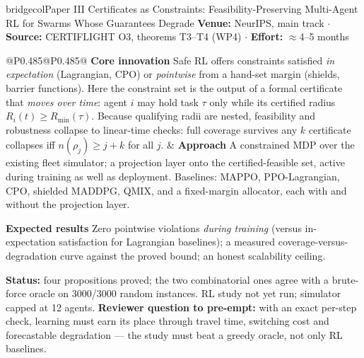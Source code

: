 \documentclass[10pt,a4paper]{article}
\newcommand{\hd}[1]{\textcolor{netcol}{\textbf{#1}}\enspace}
\begin{document}
\begin{card}{bridgecol}{Paper III}
  {Certificates as Constraints: Feasibility-Preserving Multi-Agent RL for
   Swarms Whose Guarantees Degrade}
  {}
\textbf{Venue:} NeurIPS, main track \enspace$\cdot$\enspace
\textbf{Source:} CERTIFLIGHT O3, theorems T3--T4 (WP4) \enspace$\cdot$\enspace
\textbf{Effort:} $\approx$4--5 months

\begin{tabularx}{\linewidth}{@{}P{0.485\linewidth}@{\hspace{0.03\linewidth}}P{0.485\linewidth}@{}}
\hd{Core innovation} Safe RL offers constraints satisfied \emph{in expectation}
(Lagrangian, CPO) or \emph{pointwise} from a hand-set margin (shields, barrier
functions). Here the constraint set is the output of a formal certificate that
\emph{moves over time}: agent $i$ may hold task $\tau$ only while its certified
radius $R_i(t)\ge R_{\min}(\tau)$. Because qualifying radii are nested,
feasibility and robustness collapse to linear-time checks: full coverage
survives any $k$ certificate collapses iff $n(\rho_j)\ge j+k$ for all $j$.
&
\hd{Approach} A constrained MDP over the existing fleet simulator; a projection
layer onto the certified-feasible set, active during training as well as
deployment. Baselines: MAPPO, PPO-Lagrangian, CPO, shielded MADDPG, QMIX, and a
fixed-margin allocator, each with and without the projection layer.

\hd{Expected results} Zero pointwise violations \emph{during training} (versus
in-expectation satisfaction for Lagrangian baselines); a measured
coverage-versus-degradation curve against the proved bound; an honest
scalability ceiling.
\end{tabularx}
\textbf{Status:} four propositions proved; the two combinatorial ones agree with
a brute-force oracle on 3000/3000 random instances. RL study not yet run;
simulator capped at 12 agents. \textbf{Reviewer question to pre-empt:} with an
exact per-step check, learning must earn its place through travel time,
switching cost and forecastable degradation --- the study must beat a greedy
oracle, not only RL baselines.
\end{card}
\end{document}
